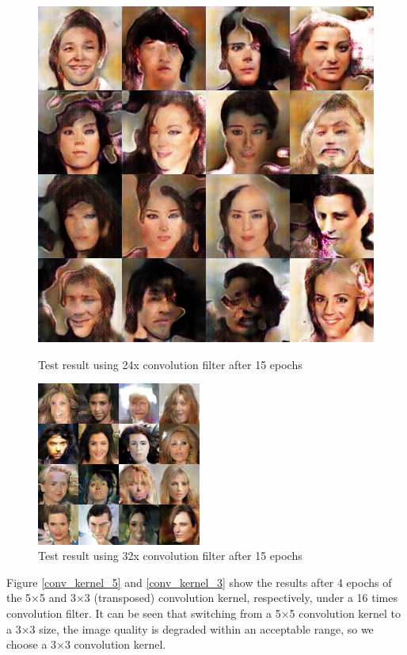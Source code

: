 \begin{figure}
\begin{minipage}[t]{0.48\linewidth}
        \includegraphics[width=\textwidth]{figures/result_conv_filter_24.png}
        \caption{Test result using 24x convolution filter after 15 epochs}
        \label{conv_filter_24}
    \end{minipage}
    \begin{minipage}[t]{\linewidth}
        \centering
        \includegraphics[width=0.48\textwidth]{figures/result_conv_filter_32.png}
        \caption{Test result using 32x convolution filter after 15 epochs}
        \label{conv_filter_32}
    \end{minipage}
\end{figure}

Figure \ref{conv_kernel_5} and \ref{conv_kernel_3} show the results after 4 epochs of the 5×5 and 3×3 (transposed) convolution kernel,
    respectively, under a 16 times convolution filter.
It can be seen that switching from a 5×5 convolution kernel to a 3×3 size,
    the image quality is degraded within an acceptable range, so we choose a 3×3 convolution kernel.

